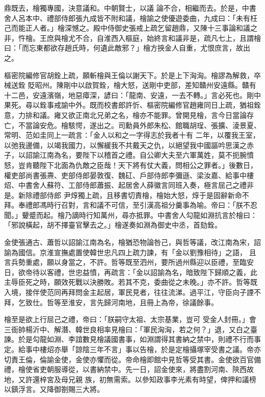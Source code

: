 \begin{pinyinscope}
 鼎既去，檜獨專國，決意議和。中朝賢士，以議
 論不合，相繼而去。於是，中書舍人呂本中、禮部侍郎張九成皆不附和議，檜諭之使優遊委曲，九成曰：「未有枉己而能正人者。」檜深憾之。殿中侍御史張戒上疏乞留趙鼎，又陳十三事論和議之非，忤檜。王庶與檜尤不合，自淮西入樞庭，始終言和議非是，疏凡七上，且謂檜曰：「而忘東都欲存趙氏時，何遺此敵邪？」檜方挾金人自重，尤恨庶言，故出之。



 樞密院編修官胡銓上疏，願斬檜與王倫以謝天下。於是上下洶洶。檜謬為解救，卒械送銓
 貶昭州。陳剛中以啟賀銓，檜大怒，送剛中吏部，差知贛州安遠縣。贛有十二邑，安遠濱嶺，地惡瘴深，諺曰：「龍南、安遠，一去不轉。」言必死也。剛中果死。尋以銓事戒諭中外。既而校書郎許忻、樞密院編修官趙雍同日上疏，猶祖銓意，力排和議。雍又欲正南北兄弟之名，檜亦不能罪。曾開見檜，言今日當論存亡，不當論安危。檜駭愕，遂出之。司勳員外郎朱松、館職胡珵、張擴、淩景夏、常明、范如圭同上一疏言：「金人以和之一字得志於我者十有
 二年，以覆我王室，以弛我邊備，以竭我國力，以懈緩我不共戴天之仇，以絕望我中國謳吟思漢之赤子，以詔諭江南為名，要陛下以稽首之禮。自公卿大夫至六軍萬姓，莫不扼腕憤怒，豈肯聽陛下北面為仇敵之臣哉！天下將有仗大義，問相公之罪者。」後數日，權吏部尚書張燾、吏部侍郎晏敦復、魏矼、戶部侍郎李彌遜、梁汝嘉、給事中樓炤、中書舍人蘇符、工部侍郎蕭振、起居舍人薛徽言同班入奏，極言屈己之禮非是。新除禮部侍郎
 尹焞獨上疏，且移書切責檜，檜始大怒，焞于是固辭新命不拜。奉禮郎馮時行召對，言和議不可信，至引漢高祖分羹事為喻。帝曰：「朕不忍聞。」顰蹙而起。檜乃謫時行知萬州，尋亦抵罪。中書舍人勾龍如淵抗言於檜曰：「邪說橫起，胡不擇臺官擊去之。」檜遂奏如淵為御史中丞，首劾銓。



 金使張通古、蕭哲以詔諭江南為名，檜猶恐物論咎己，與哲等議，改江南為宋，詔諭為國信。京淮宣撫處置使韓世忠凡四上疏力諫，有「金以劉豫相待」之語，
 且言兵勢重處，願以身當之，不許。哲等既至泗州，要所過州縣迎以臣禮，至臨安日，欲帝待以客禮，世忠益憤，再疏言：「金以詔諭為名，暗致陛下歸順之義，此主辱臣死之時，願效死戰以決勝敗。若其不克，委曲從之未晚。」亦不許。哲等既入境，接伴使范同再拜問金主起居，軍民見者，往往流涕。過平江，守臣向子諲不拜，乞致仕。哲等至淮安，言先歸河南地，且冊上為帝，徐議餘事。



 檜至是欲上行屈己之禮，帝曰：「朕嗣守太祖、太宗基業，豈可
 受金人封冊。」會三衙帥楊沂中、解潛、韓世良相率見檜曰：「軍民洶洶，若之何？」退，又白之臺諫。於是勾龍如淵、李誼數見檜議國書事，如淵謂得其書納之禁中，則禮不行而事定。給事中樓炤亦舉「諒陰三年不言」事以告檜，於是定檜攝塚宰受書之議。帝亦切責王倫，倫諭金使，金使亦懼而從。帝命檜即館中見哲等受其書。金使欲百官備禮，檜使省吏朝服導從，以書納禁中。先一日，詔金使來，將盡割河南、陝西故地，又許還梓宮及母兄親
 族，初無需索。以參知政事李光素有時望，俾押和議榜以鎮浮言。又降御劄賜三大將。




\end{pinyinscope}
